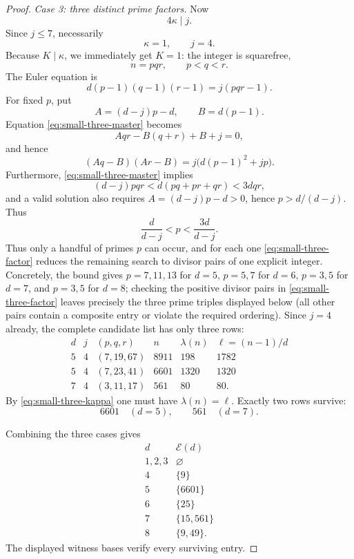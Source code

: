 \documentclass[11pt]{article}
\begin{document}
\begin{proof}
\medskip
\noindent\textit{Case 3: three distinct prime factors.}
Now
\[
4\kappa\mid j.
\]
Since $j\le7$, necessarily
\begin{equation}
\kappa=1,\qquad j=4.
\tag{S5}\label{eq:small-three-kappa}
\end{equation}
Because $K\mid \kappa$, we immediately get $K=1$: the integer is squarefree,
\[
n=pqr,
\qquad p<q<r.
\]
The Euler equation is
\begin{equation}
d(p-1)(q-1)(r-1)=j(pqr-1).
\tag{S6}\label{eq:small-three-master}
\end{equation}
For fixed $p$, put
\[
A=(d-j)p-d,
\qquad
B=d(p-1).
\]
Equation \eqref{eq:small-three-master} becomes
\[
Aqr-B(q+r)+B+j=0,
\]
and hence
\begin{equation}
(Aq-B)(Ar-B)
=j\bigl(d(p-1)^2+jp\bigr).
\tag{S7}\label{eq:small-three-factor}
\end{equation}
Furthermore, \eqref{eq:small-three-master} implies
\[
(d-j)pqr<d(pq+pr+qr)<3dqr,
\]
and a valid solution also requires $A=(d-j)p-d>0$, hence $p>d/(d-j)$.  Thus
\begin{equation}
\frac{d}{d-j}<p<\frac{3d}{d-j}.
\tag{S8}\label{eq:small-pbound}
\end{equation}
Thus only a handful of primes $p$ can occur, and for each one
\eqref{eq:small-three-factor} reduces the remaining search to divisor pairs
of one explicit integer.  Concretely, the bound gives $p=7,11,13$ for $d=5$,
$p=5,7$ for $d=6$, $p=3,5$ for $d=7$, and $p=3,5$ for $d=8$; checking the
positive divisor pairs in \eqref{eq:small-three-factor} leaves precisely the
three prime triples displayed below (all other pairs contain a composite
entry or violate the required ordering).  Since $j=4$ already, the complete
candidate list has only three rows:
\[
\begin{array}{c|c|c|c|c|c}
 d&j&(p,q,r)&n&\lambda(n)&\ell=(n-1)/d\\ \hline
5&4&(7,19,67)&8911&198&1782\\
5&4&(7,23,41)&6601&1320&1320\\
7&4&(3,11,17)&561&80&80.
\end{array}
\]
By \eqref{eq:small-three-kappa} one must have
$\lambda(n)=\ell$.  Exactly two rows survive:
\[
6601\quad(d=5),
\qquad
561\quad(d=7).
\]

Combining the three cases gives
\[
\begin{array}{c|c}
 d&\mathcal E(d)\\ \hline
1,2,3&\varnothing\\
4&\{9\}\\
5&\{6601\}\\
6&\{25\}\\
7&\{15,561\}\\
8&\{9,49\}.
\end{array}
\]
The displayed witness bases verify every surviving entry.
\end{proof}
\end{document}
